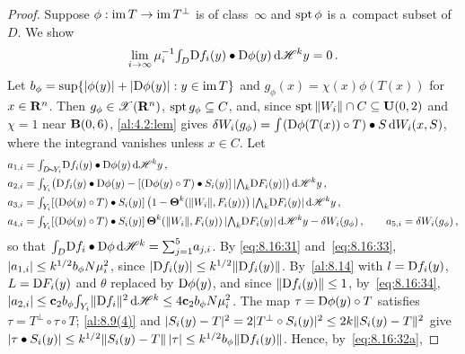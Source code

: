 \begin{proof}
    Suppose $\phi : \operatorname{im} T \to \operatorname{im} T^\perp$ is of class~$\infty$ and $\operatorname{spt} \phi$ is a~compact subset
    of~$D$. We show
    \begin{equation}
        \label{eq:8.16:37}
        \lim_{i \to \infty} \mu_i^{-1} {\textstyle\int_{D}^{}} \mathrm{D} f_i(y) \bullet \mathrm{D} \phi(y) \,\mathrm{d} \mathscr{H}^{k}
        y = 0 \,.
    \end{equation}
    Let $b_\phi = \sup \{ |\phi(y)| + |\mathrm{D} \phi(y)| : y \in \operatorname{im} T \}$ and $g_\phi(x) = \chi(x)
    \phi(T(x))$ for $x \in \mathbf{R}^{n}$. Then $g_\phi \in \mathscr{X}(\mathbf{R}^{n})$, $\operatorname{spt} g_\phi \subseteq C$,
    and, since $\operatorname{spt} \|W_i\| \cap C \subseteq \mathbf{U}(0,2)$ and $\chi = 1$ near $\mathbf{B}(0,6)$,
    \ref{al:4.2:lem} gives $\delta W_i(g_\phi) = {\textstyle\int_{}^{}} (\mathrm{D} \phi(T(x)) \circ T) \bullet S \,\mathrm{d}
    W_i(x,S)$, where the integrand vanishes unless $x \in C$. Let
    \begin{align*}
        a_{1,i} & = {\textstyle\int_{D \!\sim\! Y_i}^{}} \mathrm{D} f_i(y) \bullet \mathrm{D} \phi(y) \,\mathrm{d} \mathscr{H}^{k} y \,,
        \\
        a_{2,i} & = {\textstyle\int_{Y_i}^{}} \big( \mathrm{D} f_i(y) \bullet \mathrm{D} \phi(y) - [(\mathrm{D} \phi(y) \circ T)
        \bullet S_i(y)] \, |{\textstyle\boldsymbol{\bigwedge}}_{{k}} \mathrm{D} F_i(y)| \big) \,\mathrm{d} \mathscr{H}^{k} y \,, \\
        a_{3,i} & = {\textstyle\int_{Y_i}^{}} [(\mathrm{D} \phi(y) \circ T) \bullet S_i(y)] \, \big(1 -
        \boldsymbol{\Theta}^{k}(\|W_i\|,F_i(y)) \big) \, |{\textstyle\boldsymbol{\bigwedge}}_{{k}} \mathrm{D} F_i(y)| \,\mathrm{d} \mathscr{H}^{k} y
        \,, \\
        a_{4,i} & = {\textstyle\int_{Y_i}^{}} [(\mathrm{D} \phi(y) \circ T) \bullet S_i(y)] \,
        \boldsymbol{\Theta}^{k}(\|W_i\|,F_i(y)) \, |{\textstyle\boldsymbol{\bigwedge}}_{{k}} \mathrm{D} F_i(y)| \,\mathrm{d} \mathscr{H}^{k} y -
        \delta W_i(g_\phi) \,, \qquad a_{5,i} = \delta W_i(g_\phi) \,,
    \end{align*}
    so that ${\textstyle\int_{D}^{}} \mathrm{D} f_i \bullet \mathrm{D} \phi \,\mathrm{d} \mathscr{H}^{k} = {\textstyle\sum_{j=1}^{5}} a_{j,i}$. By
    \eqref{eq:8.16:31} and~\eqref{eq:8.16:33}, $|a_{1,i}| \le k^{1/2} b_\phi N \mu_i^2$, since
    $|\mathrm{D} f_i(y)| \le k^{1/2} \|\mathrm{D} f_i(y)\|$. By~\ref{al:8.14} with $l = \mathrm{D} f_i(y)$, $L = \mathrm{D}
    F_i(y)$ and $\theta$ replaced by $\mathrm{D} \phi(y)$, and since $\|\mathrm{D} f_i(y)\| \le 1$,
    by~\eqref{eq:8.16:34}, $|a_{2,i}| \le \mathbf{c}_2 b_\phi {\textstyle\int_{Y_i}^{}} \|\mathrm{D} f_i\|^2 \,\mathrm{d}
    \mathscr{H}^{k} \le 4 \mathbf{c}_2 b_\phi N \mu_i^2$. The map $\tau = \mathrm{D} \phi(y) \circ T$ satisfies
    $\tau = T^\perp \circ \tau \circ T$; \ref{al:8.9(4)} and $|S_i(y) - T|^2 = 2 |T^\perp \circ
    S_i(y)|^2 \le 2 k \|S_i(y) - T\|^2$ give $|\tau \bullet S_i(y)| \le k^{1/2} \|S_i(y) -
    T\| \, |\tau| \le k^{1/2} b_\phi \|\mathrm{D} f_i(y)\|$. Hence, by~\eqref{eq:8.16:32a},

\end{proof}
